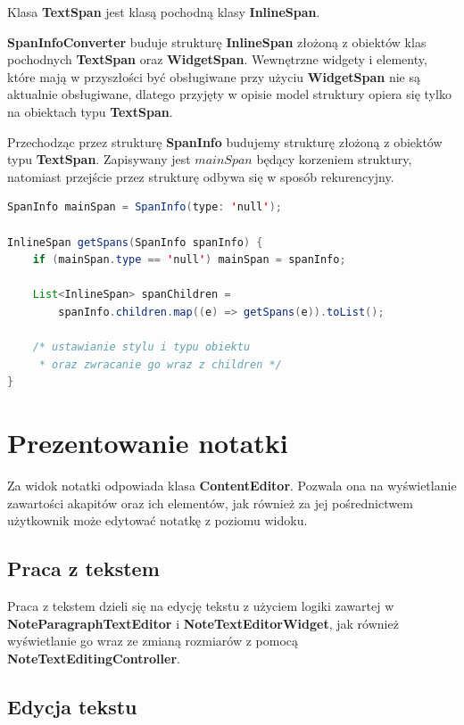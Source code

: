 Klasa \textbf{TextSpan} jest klasą pochodną klasy \textbf{InlineSpan}.

\textbf{SpanInfoConverter} buduje strukturę \textbf{InlineSpan} złożoną z obiektów klas pochodnych \textbf{TextSpan} oraz \textbf{WidgetSpan}. Wewnętrzne widgety i elementy, które mają w przyszłości być obsługiwane przy użyciu \textbf{WidgetSpan} nie są aktualnie obsługiwane, dlatego przyjęty w opisie model struktury opiera się tylko na obiektach typu \textbf{TextSpan}.

Przechodząc przez strukturę \textbf{SpanInfo} budujemy strukturę złożoną z obiektów typu \textbf{TextSpan}. Zapisywany jest $mainSpan$ będący korzeniem struktury, natomiast przejście przez strukturę odbywa się w sposób rekurencyjny.

\begin{lstlisting}[language=Java]
SpanInfo mainSpan = SpanInfo(type: 'null');

InlineSpan getSpans(SpanInfo spanInfo) {
    if (mainSpan.type == 'null') mainSpan = spanInfo;

    List<InlineSpan> spanChildren =
        spanInfo.children.map((e) => getSpans(e)).toList();

    /* ustawianie stylu i typu obiektu 
     * oraz zwracanie go wraz z children */
}
\end{lstlisting}


\section{Prezentowanie notatki}

Za widok notatki odpowiada klasa \textbf{ContentEditor}. Pozwala ona na wyświetlanie zawartości akapitów oraz ich elementów, jak również za jej pośrednictwem użytkownik może edytować notatkę z poziomu widoku.

\subsection{Praca z tekstem}

Praca z tekstem dzieli się na edycję tekstu z użyciem logiki zawartej w \textbf{NoteParagraphTextEditor} i \textbf{NoteTextEditorWidget}, jak również wyświetlanie go wraz ze zmianą rozmiarów z pomocą \textbf{NoteTextEditingController}.

\subsection{Edycja tekstu}

